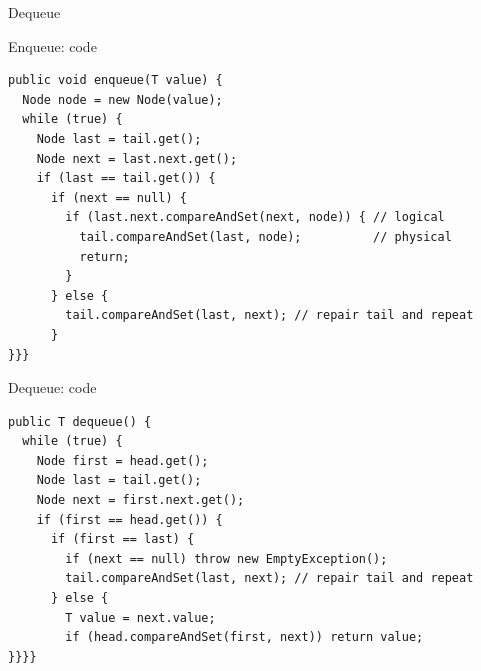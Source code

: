 \begin{frame}[fragile]{Dequeue}
\end{frame}

\begin{frame}[fragile]{Enqueue: code}

\begin{verbatim}
public void enqueue(T value) {
  Node node = new Node(value);
  while (true) {
    Node last = tail.get();
    Node next = last.next.get();
    if (last == tail.get()) {
      if (next == null) {
        if (last.next.compareAndSet(next, node)) { // logical
          tail.compareAndSet(last, node);          // physical
          return;
        }
      } else {
        tail.compareAndSet(last, next); // repair tail and repeat
      }
}}}
\end{verbatim}
\end{frame}

\begin{frame}[fragile]{Dequeue: code}

\begin{verbatim}
public T dequeue() {
  while (true) {
    Node first = head.get();
    Node last = tail.get();
    Node next = first.next.get();
    if (first == head.get()) {
      if (first == last) {
        if (next == null) throw new EmptyException();
        tail.compareAndSet(last, next); // repair tail and repeat
      } else {
        T value = next.value;
        if (head.compareAndSet(first, next)) return value;
}}}}
\end{verbatim}
\end{frame}

